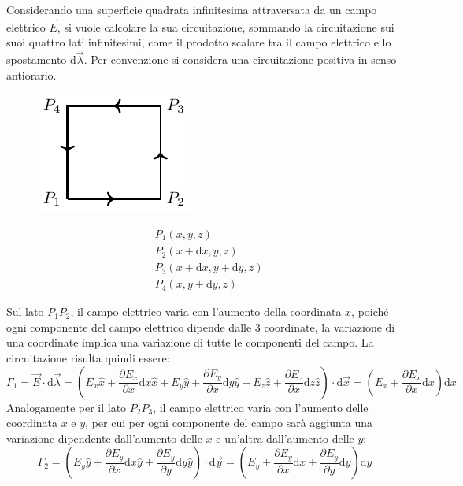 \documentclass{article}
\newcommand{\df}{\mathrm{d}}
\numberwithin{equation}{subsection}
\begin{document}
Considerando una superficie quadrata infinitesima attraversata da un campo elettrico $\vec{E}$, si vuole calcolare la sua circuitazione, sommando la circuitazione sui suoi 
quattro lati infinitesimi, come il prodotto scalare tra il campo elettrico e lo spostamento $\df\vec{\lambda}$. Per convenzione si considera una circuitazione positiva in senso 
antiorario. 
\begin{figure}[H]%
    \centering
    \includegraphics{teorema-rotore.pdf}
    \label{fig:toeorema-rotore}
\end{figure}
\begin{align*}
    &P_1(x,y,z)\\
    &P_2(x+\df  x,y,z)\\
    &P_3(x+\df  x,y+\df  y,z)\\
    &P_4(x,y+\df  y,z)
\end{align*}

Sul lato $P_1P_2$, il campo elettrico varia con l'aumento della coordinata $x$, poiché ogni componente del campo elettrico dipende dalle $3$ coordinate, la variazione di una 
coordinate implica una variazione di tutte le componenti del campo. La circuitazione risulta quindi essere:
\begin{equation*}
    \Gamma_1=\vec{E}\cdot \df\vec{\lambda}=\left(E_x\hat{x}+\displaystyle\frac{\partial E_x}{\partial x}\df  x\hat{x}+E_y\hat{y}+\frac{\partial E_y}{\partial x}\df  y\hat{y}+E_z\hat{z}+\frac{\partial E_z}{\partial x}\df z\hat{z}\right)\cdot \df\vec{x}=\left(E_x+\frac{\partial E_x}{\partial x}\df  x\right)\df  x
\end{equation*}
Analogamente per il lato $P_2P_3$, il campo elettrico varia con l'aumento delle coordinata $x$ e $y$, per cui per ogni componente del campo sarà aggiunta una variazione dipendente 
dall'aumento delle $x$ e un'altra dall'aumento delle $y$:
\begin{equation*}
    \Gamma_2=\left(E_y\hat{y}+\displaystyle\frac{\partial E_y}{\partial x}\df  x\hat{y}+\frac{\partial E_y}{\partial y}\df  y\hat{y}\right)\cdot \df\vec{y}=\left(E_y+\frac{\partial E_y}{\partial x}\df  x+\frac{\partial E_y}{\partial y}\df  y\right)\df  y
\end{equation*}
\end{document}
